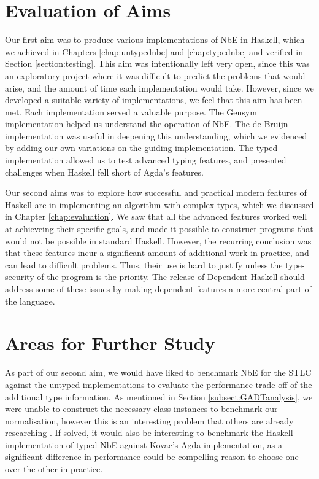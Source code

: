 \section{Evaluation of Aims}


Our first aim was to produce various implementations of NbE in Haskell, which we achieved in Chapters \ref{chap:untypednbe} and \ref{chap:typednbe} and verified in Section \ref{section:testing}. This aim was intentionally left very open, since this was an exploratory project where it was difficult to predict the problems that would arise, and the amount of time each implementation would take. However, since we developed a suitable variety of implementations, we feel that this aim has been met. Each implementation served a valuable purpose. The Gensym implementation helped us understand the operation of NbE. The de Bruijn implementation was useful in deepening this understanding, which we evidenced by adding our own variations on the guiding implementation. The typed implementation allowed us to test advanced typing features, and presented challenges when Haskell fell short of Agda's features. 

Our second aims was to explore how successful and practical modern features of Haskell are in implementing an algorithm with complex types, which we discussed in Chapter \ref{chap:evaluation}. We saw that all the advanced features worked well at achieveing their specific goals, and made it possible to construct programs that would not be possible in standard Haskell. However, the recurring conclusion was that these features incur a significant amount of additional work in practice, and can lead to difficult problems. Thus, their use is hard to justify unless the type-security of the program is the priority. The release of Dependent Haskell \cite{DH} should address some of these issues by making dependent features a more central part of the language.

\section{Areas for Further Study}

As part of our second aim, we would have liked to benchmark NbE for the STLC against the untyped implementations to evaluate the performance trade-off of the additional type information. As mentioned in Section \ref{subsect:GADTanalysis}, we were unable to construct the necessary class instances to benchmark our normalisation, however this is an interesting problem that others are already researching \cite{gadtClassInstances}. If solved, it would also be interesting to benchmark the Haskell implementation of typed NbE against Kovac's Agda implementation, as a significant difference in performance could be compelling reason to choose one over the other in practice.

